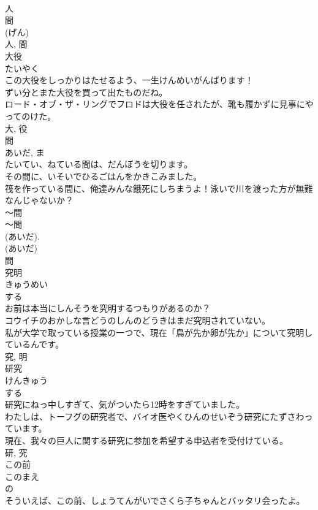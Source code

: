 \documentclass[8pt]{extreport}
\begin{document}
\begin{CJK}{UTF8}{min}
\\	人 
\\	間 
\\	(げん) 
\\	人, 間	
\\	大役	
\\	たいやく	
\\	この大役をしっかりはたせるよう、一生けんめいがんばります！	
\\	ずい分とまた大役を買って出たものだね。	
\\	ロード・オブ・ザ・リングでフロドは大役を任されたが、靴も履かずに見事にやってのけた。	
\\	大, 役	
\\	間	
\\	あいだ, ま	
\\	たいてい、ねている間は、だんぼうを切ります。	
\\	その間に、いそいでひるごはんをかきこみました。	
\\	筏を作っている間に、俺達みんな餓死にしちまうよ！泳いで川を渡った方が無難なんじゃないか？	
\\	〜間 
\\	〜間 
\\	(あいだ). 
\\	(あいだ) 
\\	間	
\\	究明	
\\	きゅうめい	
\\	する 
\\	お前は本当にしんそうを究明するつもりがあるのか？	
\\	コウイチのおかしな言どうのしんのどうきはまだ究明されていない。	
\\	私が大学で取っている授業の一つで、現在「鳥が先か卵が先か」について究明しているんです。	
\\	究, 明	
\\	研究	
\\	けんきゅう	
\\	する 
\\	研究にねっ中しすぎて、気がついたら12時をすぎていました。	
\\	わたしは、トーフグの研究者で、バイオ医やくひんのせいぞう研究にたずさわっています。	
\\	現在、我々の巨人に関する研究に参加を希望する申込者を受付けている。	
\\	研, 究	
\\	この前	
\\	このまえ	
\\	の 
\\	そういえば、この前、しょうてんがいでさくら子ちゃんとバッタリ会ったよ。	

\end{CJK}
\end{document}
